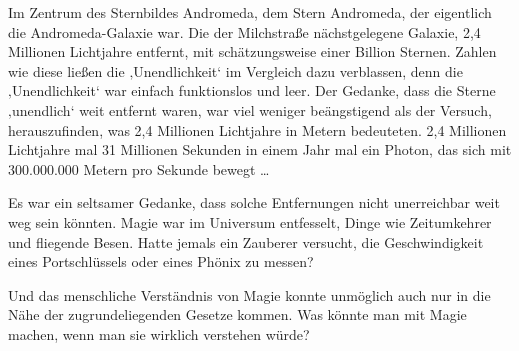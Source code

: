 Im Zentrum des Sternbildes Andromeda, dem Stern Andromeda, der eigentlich die Andromeda-Galaxie war. Die der Milchstraße nächstgelegene Galaxie, 2,4 Millionen Lichtjahre entfernt, mit schätzungsweise einer Billion Sternen.
Zahlen wie diese ließen die ‚Unendlichkeit‘ im Vergleich dazu verblassen, denn die ‚Unendlichkeit‘ war einfach funktionslos und leer. Der Gedanke, dass die Sterne ‚unendlich‘ weit entfernt waren, war viel weniger beängstigend als der Versuch, herauszufinden, was 2,4 Millionen Lichtjahre in Metern bedeuteten. 2,4 Millionen Lichtjahre mal 31 Millionen Sekunden in einem Jahr mal ein Photon, das sich mit 300.000.000 Metern pro Sekunde bewegt …

Es war ein seltsamer Gedanke, dass solche Entfernungen nicht unerreichbar weit weg sein könnten. Magie war im Universum entfesselt, Dinge wie Zeitumkehrer und fliegende Besen. Hatte jemals ein Zauberer versucht, die Geschwindigkeit eines Portschlüssels oder eines Phönix zu messen?

Und das menschliche Verständnis von Magie konnte unmöglich auch nur in die Nähe der zugrundeliegenden Gesetze kommen. Was könnte man mit Magie machen, wenn man sie wirklich verstehen würde?

